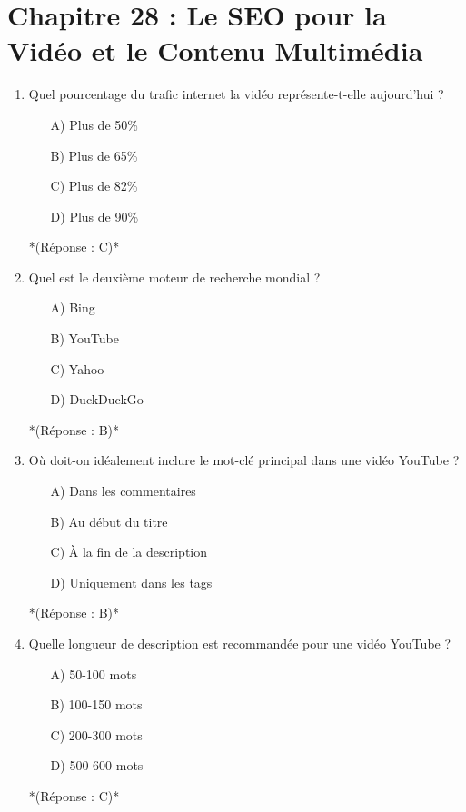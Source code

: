 \documentclass[12pt,a4paper,twoside]{report}
\begin{document}
\section*{Chapitre 28 : Le SEO pour la Vidéo et le Contenu Multimédia}
\begin{enumerate}
    \item Quel pourcentage du trafic internet la vidéo représente-t-elle aujourd'hui ?
    \begin{itemize}
        \item[A)] Plus de 50\%
        \item[B)] Plus de 65\%
        \item[C)] Plus de 82\%
        \item[D)] Plus de 90\%
    \end{itemize}
    *(Réponse : C)*

    \item Quel est le deuxième moteur de recherche mondial ?
    \begin{itemize}
        \item[A)] Bing
        \item[B)] YouTube
        \item[C)] Yahoo
        \item[D)] DuckDuckGo
    \end{itemize}
    *(Réponse : B)*

    \item Où doit-on idéalement inclure le mot-clé principal dans une vidéo YouTube ?
    \begin{itemize}
        \item[A)] Dans les commentaires
        \item[B)] Au début du titre
        \item[C)] À la fin de la description
        \item[D)] Uniquement dans les tags
    \end{itemize}
    *(Réponse : B)*

    \item Quelle longueur de description est recommandée pour une vidéo YouTube ?
    \begin{itemize}
        \item[A)] 50-100 mots
        \item[B)] 100-150 mots
        \item[C)] 200-300 mots
        \item[D)] 500-600 mots
    \end{itemize}
    *(Réponse : C)*


\end{enumerate}
\end{document}
